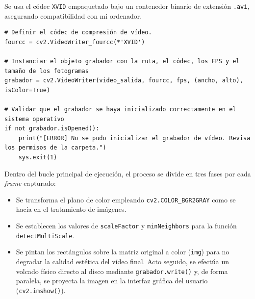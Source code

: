 Se usa el códec \texttt{XVID} empaquetado bajo un contenedor binario de extensión \texttt{.avi}, asegurando compatibilidad con mi ordenador.

\begin{lstlisting}[style=pythonstyle, caption={Códec y extensión}, label={lst:extension}]
# Definir el códec de compresión de vídeo.
fourcc = cv2.VideoWriter_fourcc(*'XVID')

# Instanciar el objeto grabador con la ruta, el códec, los FPS y el tamaño de los fotogramas
grabador = cv2.VideoWriter(video_salida, fourcc, fps, (ancho, alto), isColor=True)

# Validar que el grabador se haya inicializado correctamente en el sistema operativo
if not grabador.isOpened():
    print("[ERROR] No se pudo inicializar el grabador de vídeo. Revisa los permisos de la carpeta.")
    sys.exit(1)
\end{lstlisting}

Dentro del bucle principal de ejecución, el proceso se divide en tres fases por cada \textit{frame} capturado:
\begin{itemize}
        \item Se transforma el plano de color empleando \texttt{cv2.COLOR\_BGR2GRAY} como se hacía en el tratamiento de imágenes.
        \item Se establecen los valores de \texttt{scaleFactor} y \texttt{minNeighbors}  para la función \texttt{detectMultiScale}.
        \item Se pintan los rectángulos sobre la matriz original a color (\texttt{img}) para no degradar la calidad estética del vídeo final. Acto seguido, se efectúa un volcado físico directo al disco mediante \texttt{grabador.write()} y, de forma paralela, se proyecta la imagen en la interfaz gráfica del usuario (\texttt{cv2.imshow()}).
\end{itemize}


